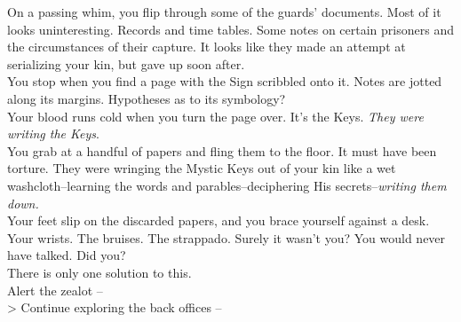 On a passing whim, you flip through some of the guards’ documents. Most of it looks uninteresting. Records and time tables. Some notes on certain prisoners and the circumstances of their capture. It looks like they made an attempt at serializing your kin, but gave up soon after.\\

You stop when you find a page with the Sign scribbled onto it. Notes are jotted along its margins. Hypotheses as to its symbology?\\

Your blood runs cold when you turn the page over. It’s the Keys. \emph{They were writing the Keys}.\\

You grab at a handful of papers and fling them to the floor. It must have been torture. They were wringing the Mystic Keys out of your kin like a wet washcloth--learning the words and parables--deciphering His secrets--\emph{writing them down.}\\

Your feet slip on the discarded papers, and you brace yourself against a desk. Your wrists. The bruises. The strappado. Surely it wasn’t you? You would never have talked. Did you?\\

There is only one solution to this.\\

 Alert the zealot --  \\
> Continue exploring the back offices -- 